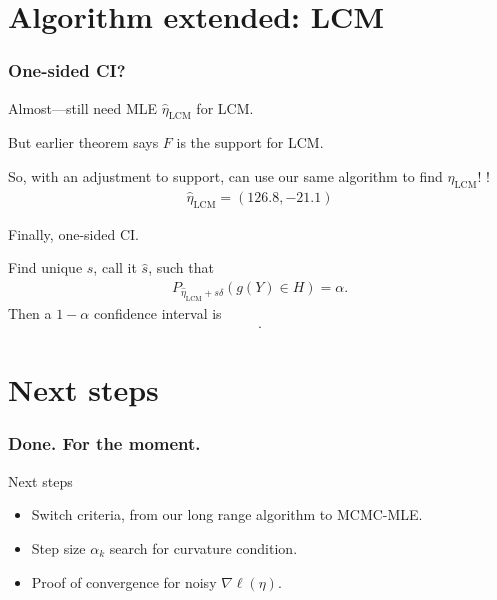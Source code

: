 \documentclass[ 10pt]{beamer}
\newcommand{\etaLCM}{\hat{\eta}_{\textrm{LCM}}}
\begin{document}
\section{Algorithm extended: LCM}
\frame
{
\frametitle{One-sided CI?}  
Almost---still need MLE $\etaLCM$ for LCM.
\vspace{1mm}
\pause

But earlier theorem says $F$ is the support for LCM.
\vspace{1mm}

So, with an adjustment to support, can use our same algorithm to find $\etaLCM$!   \alert{\checkmark}!
\pause
\begin{align*}
	\etaLCM = (126.8, -21.1)
\end{align*}

Finally, one-sided CI.
\pause

Find unique $s$, call it $\hat{s}$, such that
\begin{align*}
		P_{\etaLCM + s \delta}( g(Y) \in H) = \alpha.
\end{align*}
Then a $1- \alpha$ confidence interval is
\begin{align*}
[ \etaLCM + \hat{s} \delta, + \infty)
\end{align*}

In this example, we calculate a non-simultaneous 95\% confidence region
\begin{align*}
	[9.145, +\infty) \\
	(-\infty, -1.500].
\end{align*}
}
\section{Next steps}
\frame
{
\frametitle{Done.  For the moment.}


Next steps
\begin{itemize}
	\item Switch criteria, from our long range algorithm to MCMC-MLE.  
	\item Step size $\alpha_k$ search for curvature condition.
	\item Proof of convergence for noisy $\nabla \ell( \eta)$.
\end{itemize}
}
\end{document}
